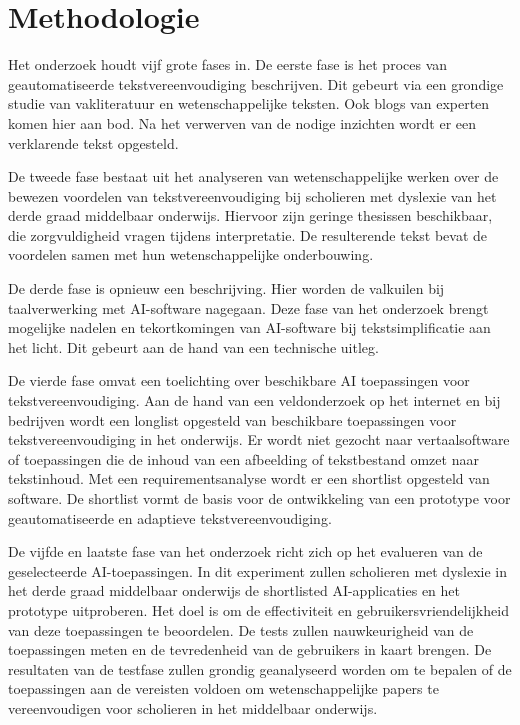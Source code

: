 \section{Methodologie}%
\label{sec:methodologie}
Het onderzoek houdt vijf grote fases in. De eerste fase is het proces van geautomatiseerde tekstvereenvoudiging beschrijven. Dit gebeurt via een grondige studie van vakliteratuur en wetenschappelijke teksten. Ook blogs van experten komen hier aan bod. Na het verwerven van de nodige inzichten wordt er een verklarende tekst opgesteld.

De tweede fase bestaat uit het analyseren van wetenschappelijke werken over de bewezen voordelen van tekstvereenvoudiging bij scholieren met dyslexie van het derde graad middelbaar onderwijs. Hiervoor zijn geringe thesissen beschikbaar, die zorgvuldigheid vragen tijdens interpretatie. De resulterende tekst bevat de voordelen samen met hun wetenschappelijke onderbouwing.

De derde fase is opnieuw een beschrijving. Hier worden de valkuilen bij taalverwerking met AI-software nagegaan. Deze fase van het onderzoek brengt mogelijke nadelen en tekortkomingen van AI-software bij tekstsimplificatie aan het licht. Dit gebeurt aan de hand van een technische uitleg.

De vierde fase omvat een toelichting over beschikbare AI toepassingen voor tekstvereenvoudiging. Aan de hand van een veldonderzoek op het internet en bij bedrijven wordt een longlist opgesteld van beschikbare toepassingen voor tekstvereenvoudiging in het onderwijs. Er wordt niet gezocht naar vertaalsoftware of toepassingen die de inhoud van een afbeelding of tekstbestand omzet naar tekstinhoud. Met een requirementsanalyse wordt er een shortlist opgesteld van software. De shortlist vormt de basis voor de ontwikkeling van een prototype voor geautomatiseerde en adaptieve tekstvereenvoudiging.

De vijfde en laatste fase van het onderzoek richt zich op het evalueren van de geselecteerde AI-toepassingen. In dit experiment zullen scholieren met dyslexie in het derde graad middelbaar onderwijs de shortlisted AI-applicaties en het prototype uitproberen. Het doel is om de effectiviteit en gebruikersvriendelijkheid van deze toepassingen te beoordelen. De tests zullen nauwkeurigheid van de toepassingen meten en de tevredenheid van de gebruikers in kaart brengen. De resultaten van de testfase zullen grondig geanalyseerd worden om te bepalen of de toepassingen aan de vereisten voldoen om wetenschappelijke papers te vereenvoudigen voor scholieren in het middelbaar onderwijs.

